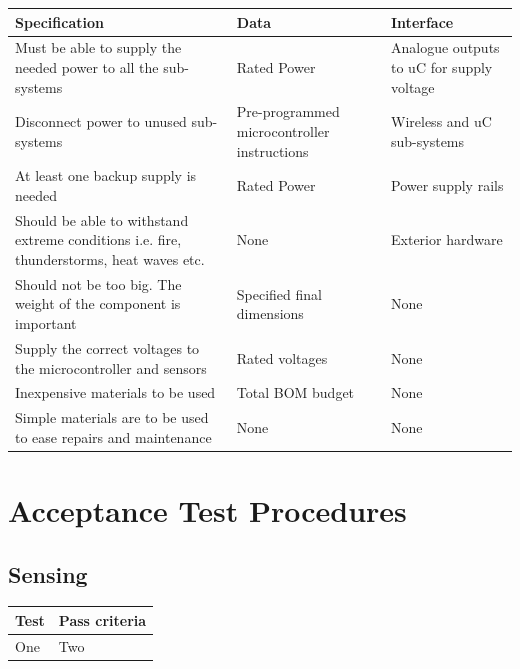 \documentclass[12pt]{article}
\begin{document}
\begin{center}
  \begin{table}[!htb]
    
    \hskip-2.2cm\begin{tabular}{|p{10cm}|p{4cm}|p{4cm}|}
        \hline
        \textbf{Specification} & \textbf{Data} & \textbf{Interface} \\
        \hline
        Must be able to supply the needed power to all the sub-systems & Rated Power & Analogue outputs to uC for supply voltage \\[0.3cm]
        Disconnect power to unused sub-systems & Pre-programmed microcontroller instructions & Wireless and uC sub-systems\\[0.3cm]
        At least one backup supply is needed & Rated Power & Power supply rails\\[0.3cm]
        Should be able to withstand extreme conditions i.e. fire, thunderstorms, heat waves etc. & None & Exterior hardware\\[0.3cm]
        Should not be too big. The weight of the component is important & Specified final dimensions & None\\[0.3cm]
        Supply the correct voltages to the microcontroller and sensors & Rated voltages & None\\[0.3cm]
        Inexpensive materials to be used & Total BOM budget & None\\[0.3cm]
        Simple materials are to be used to ease repairs and maintenance & None & None \\[0.3cm]

        \hline

    \end{tabular}    
    
    \label{tab:summary_measurments}
   \end{table}
\end{center}

\newpage
\section{Acceptance Test Procedures}
\subsection{Sensing}
\begin{center}
  \begin{table}[!htb]
    
    \hskip-2.2cm\begin{tabular}{|p{8cm}|p{10cm}|}
        \hline
        \textbf{Test} & \textbf{Pass criteria} \\
        \hline

        One & Two \\

        \hline

      \end{tabular}    
      
      \label{tab:summary_measurments}
     \end{table}
  \end{center}
\end{document}
